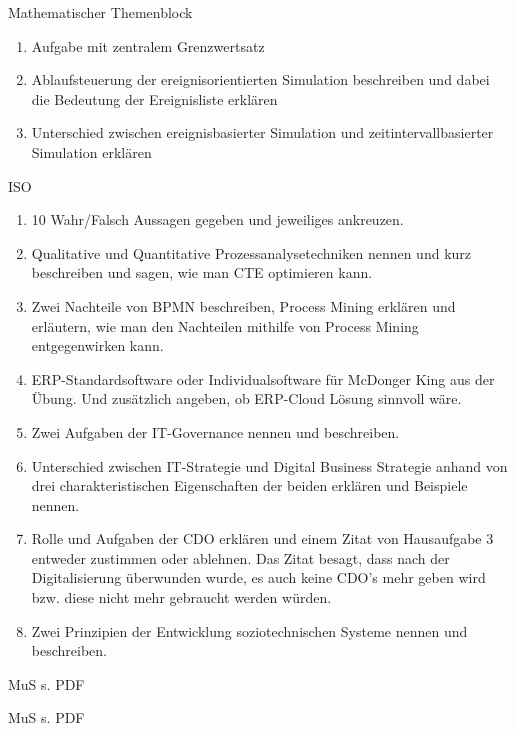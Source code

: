 \documentclass{article}
\begin{document}
\begin{exercise}{Mathematischer Themenblock}
  \begin{enumerate}
    \item Aufgabe mit zentralem Grenzwertsatz
    \item Ablaufsteuerung der ereignisorientierten Simulation beschreiben und dabei die Bedeutung der Ereignisliste erklären
    \item Unterschied zwischen ereignisbasierter Simulation und zeitintervallbasierter Simulation erklären
  \end{enumerate}
\end{exercise}

\begin{exercise}{ISO}
  \begin{enumerate}
    \item 10 Wahr/Falsch Aussagen gegeben und jeweiliges ankreuzen.
    \item Qualitative und Quantitative Prozessanalysetechniken nennen und kurz beschreiben und sagen, wie man CTE optimieren kann.
    \item Zwei Nachteile von BPMN beschreiben, Process Mining erklären und erläutern, wie man den Nachteilen mithilfe von Process Mining entgegenwirken kann.
    \item ERP-Standardsoftware oder Individualsoftware für McDonger King aus der Übung. Und zusätzlich angeben, ob ERP-Cloud Lösung sinnvoll wäre.
    \item Zwei Aufgaben der IT-Governance nennen und beschreiben.
    \item Unterschied zwischen IT-Strategie und Digital Business Strategie anhand von drei charakteristischen Eigenschaften der beiden erklären und Beispiele nennen.
    \item Rolle und Aufgaben der CDO erklären und einem Zitat von Hausaufgabe 3 entweder zustimmen oder ablehnen. Das Zitat besagt, dass nach der Digitalisierung überwunden wurde, es auch keine CDO's mehr geben wird bzw. diese nicht mehr gebraucht werden würden.
    \item Zwei Prinzipien der Entwicklung soziotechnischen Systeme nennen und beschreiben.
  \end{enumerate}
\end{exercise}

\begin{exercise}[2]{MuS}
  s. PDF
\end{exercise}

\begin{exercise}[3]{MuS}
  s. PDF
\end{exercise}
\end{document}
